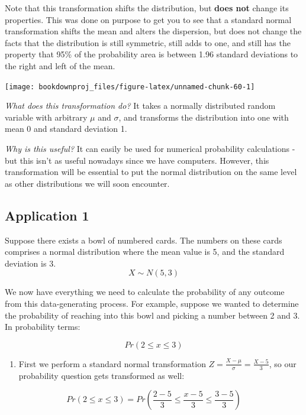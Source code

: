 \documentclass[
]{book}
\providecommand{\tightlist}{%
  \setlength{\itemsep}{0pt}\setlength{\parskip}{0pt}}
\begin{document}
Note that this transformation shifts the distribution, but \textbf{does not} change its properties. This was done on purpose to get you to see that a standard normal transformation shifts the mean and alters the dispersion, but does not change the facts that the distribution is still symmetric, still adds to one, and still has the property that 95\% of the probability area is between 1.96 standard deviations to the right and left of the mean.

\begin{center}\texttt{[image: bookdownproj\_files/figure-latex/unnamed-chunk-60-1]} \end{center}

\emph{What does this transformation do?} It takes a normally distributed random variable with arbitrary \(\mu\) and \(\sigma\), and transforms the distribution into one with mean 0 and standard deviation 1.

\emph{Why is this useful?} It can easily be used for numerical probability calculations - but this isn't as useful nowadays since we have computers. However, this transformation will be essential to put the normal distribution on the same level as other distributions we will soon encounter.

\subsection{Application 1}\label{application-1}

Suppose there exists a bowl of numbered cards. The numbers on these cards comprises a normal distribution where the mean value is 5, and the standard deviation is 3.
\[X \sim N(5,3)\]

We now have everything we need to calculate the probability of any outcome from this data-generating process. For example, suppose we wanted to determine the probability of reaching into this bowl and picking a number between 2 and 3. In probability terms:

\[Pr(2 \leq x \leq 3)\]

\begin{enumerate}
\def\labelenumi{\arabic{enumi}.}
\tightlist
\item
  First we perform a standard normal transformation \(Z=\frac{X-\mu}{\sigma}=\frac{X-5}{3}\), so our probability question gets transformed as well:
\end{enumerate}

\[Pr(2 \leq x \leq 3)=Pr\left(\frac{2-5}{3} \leq \frac{x-5}{3} \leq \frac{3-5}{3}\right)\]
\end{document}
